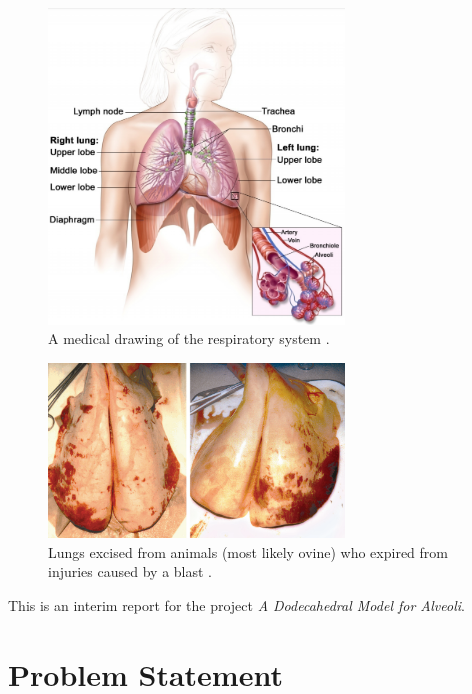 \begin{figure}
    \centering
    \includegraphics[width=0.7\textwidth]{figures/theRespiratorySystem.png}
    \caption{A medical drawing of the respiratory system \cite{Josey10}.}
    \label{figLungDrawing}
\end{figure}

\begin{figure}
    \centering
    \includegraphics[width=0.7\textwidth]{figures/lungInjuryResultingFromBlast.png}
    \caption{Lungs excised from animals (most likely ovine) who expired from injuries caused by a blast \cite{Stuhmiller08}.}
    \label{figDamagedLung}
\end{figure} 

This is an interim report for the project \textit{A Dodecahedral Model for Alveoli}.

\section{Problem Statement}

